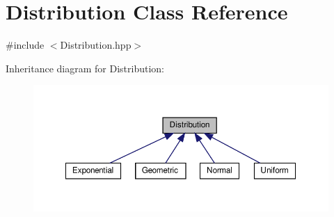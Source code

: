 \hypertarget{classDistribution}{}\section{Distribution Class Reference}
\label{classDistribution}


{\ttfamily \#include $<$Distribution.\+hpp$>$}



Inheritance diagram for Distribution\+:
\nopagebreak
\begin{figure}[H]
\begin{center}
\leavevmode
\includegraphics[width=350pt]{classDistribution__inherit__graph}
\end{center}
\end{figure}
